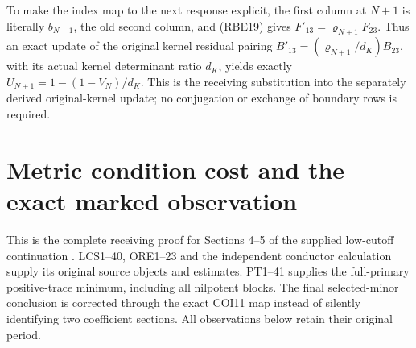 To make the index map to the next response explicit, the first
column at \(N+1\) is literally \(b_{N+1}\), the old second
column, and (RBE19) gives \(F'_{13}=\varrho_{N+1}F_{23}\).
Thus an exact update of the original kernel residual pairing
\(B'_{13}=(\varrho_{N+1}/d_K)B_{23}\), with its actual
kernel determinant ratio \(d_K\), yields exactly
\(U_{N+1}=1-(1-V_N)/d_K\). This is the receiving substitution
into the separately derived original-kernel update; no conjugation
or exchange of boundary rows is required.



\endgroup

\clearpage
\begingroup
\def\C{\mathbb C}
\def\Tr{\operatorname{Tr}}
\def\im{\operatorname{im}}
\def\cond{\operatorname{cond}}
\def\lc{\operatorname{lc}}
\def\norm#1{\left\lVert#1\right\rVert}

\setcounter{equation}{0}
\renewcommand{\theequation}{A04CMO.\arabic{equation}}
\section*{Metric condition cost and the exact marked observation}


This is the complete receiving proof for Sections 4--5 of the
supplied low-cutoff continuation \cite{a04cmo:source}. LCS1--40, ORE1--23 and the
independent conductor calculation supply its original source
objects and estimates. PT1--41 \cite{a04cmo:PT} supplies the full-primary
positive-trace minimum, including all nilpotent blocks.
The final selected-minor conclusion is corrected through the
exact COI11 map \cite{a04cmo:COI} instead of silently identifying two coefficient
sections. All observations below retain their original period.


